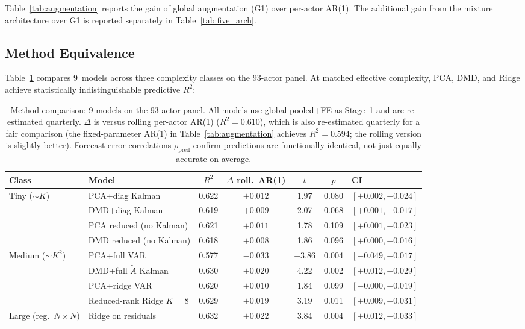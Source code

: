 \documentclass[11pt,a4paper]{article}
\begin{document}
Table~\ref{tab:augmentation} reports the gain of global augmentation (G1) over per-actor AR(1). The additional gain from the mixture architecture over G1 is reported separately in Table~\ref{tab:five_arch}.

\subsection{Method Equivalence}
\label{sec:method_equiv}

Table~\ref{tab:method_comparison} compares 9~models across three complexity classes on the 93-actor panel. At matched effective complexity, PCA, DMD, and Ridge achieve statistically indistinguishable predictive $R^2$:

\begin{table}[H]
\centering
\caption{Method comparison: 9 models on the 93-actor panel. All models use global pooled+FE as Stage~1 and are re-estimated quarterly. $\Delta$ is versus rolling per-actor AR(1) ($R^2 = 0.610$), which is also re-estimated quarterly for a fair comparison (the fixed-parameter AR(1) in Table~\ref{tab:augmentation} achieves $R^2 = 0.594$; the rolling version is slightly better). Forecast-error correlations $\rho_{\mathrm{pred}}$ confirm predictions are functionally identical, not just equally accurate on average.}
\label{tab:method_comparison}
\small
\begin{tabular}{llccccl}
\toprule
Class & Model & $R^2$ & $\Delta$ roll.\ AR(1) & $t$ & $p$ & CI \\
\midrule
\multirow{4}{*}{Tiny (${\sim}K$)} & PCA+diag Kalman & 0.622 & $+0.012$ & 1.97 & 0.080 & $[+0.002, +0.024]$ \\
& DMD+diag Kalman & 0.619 & $+0.009$ & 2.07 & 0.068 & $[+0.001, +0.017]$ \\
& PCA reduced (no Kalman) & 0.621 & $+0.011$ & 1.78 & 0.109 & $[+0.001, +0.023]$ \\
& DMD reduced (no Kalman) & 0.618 & $+0.008$ & 1.86 & 0.096 & $[+0.000, +0.016]$ \\
\midrule
\multirow{4}{*}{Medium (${\sim}K^2$)} & PCA+full VAR & 0.577 & $-0.033$ & $-3.86$ & 0.004 & $[-0.049, -0.017]$ \\
& DMD+full $\tilde{A}$ Kalman & 0.630 & $+0.020$ & 4.22 & 0.002 & $[+0.012, +0.029]$ \\
& PCA+ridge VAR & 0.620 & $+0.010$ & 1.84 & 0.099 & $[-0.000, +0.019]$ \\
& Reduced-rank Ridge $K{=}8$ & 0.629 & $+0.019$ & 3.19 & 0.011 & $[+0.009, +0.031]$ \\
\midrule
Large (reg.\ $N \!\times\! N$) & Ridge on residuals & 0.632 & $+0.022$ & 3.84 & 0.004 & $[+0.012, +0.033]$ \\
\bottomrule
\end{tabular}


\end{table}
\end{document}
